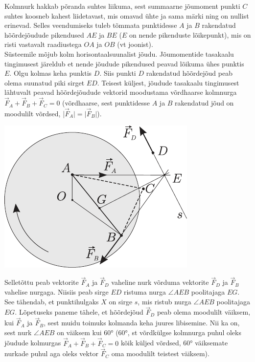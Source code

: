\solu
\osa Kolmnurk hakkab põranda suhtes liikuma, sest summaarne jõumoment punkti $C$ suhtes koosneb kahest liidetavast, mis omavad ühte ja sama märki ning on nullist erinevad. Selles veendumiseks tuleb tõmmata punktidesse $A$ ja $B$ rakendatud hõõrdejõudude pikendused $AE$ ja $BE$ ($E$ on nende pikenduste lõikepunkt), mis on risti vastavalt raadiustega $OA$ ja $OB$ (vt joonist).\\
\osa Süsteemile mõjub kolm horisontaalsuunalist jõudu. Jõumomentide tasakaalu tingimusest järeldub et nende jõudude pikendused peavad lõikuma ühes punktis $E$. Olgu kolmas keha punktis $D$. Siis punkti $D$ rakendatud hõõrdejõud peab olema suunatud piki sirget $ED$. Teisest küljest, jõudude tasakaalu tingimusest lähtuvalt peavad hõõrdejõudude vektorid moodustama võrdhaarse kolmnurga $\vec F_A+\vec F_B+\vec F_C = 0$ (võrdhaarse, sest punktidesse $A$ ja $B$ rakendatud jõud on moodulilt võrdsed, |$\vec F_A| = |\vec F_B|$).

\begin{center}
	\includegraphics[width=0.7\linewidth]{2005-v3g-10-lah}
\end{center}

Selletõttu peab vektorite $\vec F_A$ ja $\vec F_D$ vaheline nurk võrduma vektorite $\vec F_D$ ja $\vec F_B$ vahelise nurgaga. Niisiis peab sirge $ED$ ristuma nurga $\angle AEB$ poolitajaga $EG$. See tähendab, et punktihulgaks $X$ on sirge $s$, mis ristub nurga $\angle AEB$ poolitajaga $EG$. Lõpetuseks paneme tähele, et hõõrdejõud $\vec F_D$ peab olema moodulilt väiksem, kui $\vec F_A$ ja $\vec F_B$, sest muidu toimuks kolmanda keha juures libisemine. Nii ka on, sest nurk $\angle AEB$ on väiksem kui \ang{60} (\ang{60}, st võrdkülgse kolmnurga puhul oleks jõudude kolmurgas $\vec F_A + \vec F_B + \vec F_C = 0$ kõik küljed võrdsed, \ang{60} väiksemate nurkade puhul aga oleks vektor $\vec F_C$ oma moodulilt teistest väiksem).
\probend